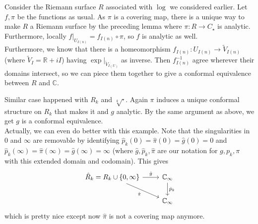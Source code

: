 \begin{example}
    Consider the Riemann surface $R$ associated with $\log$ we considered earlier.
    Let $f,\pi$ be the functions as usual.
    As $\pi$ is a covering map, there is a unique way to make $R$ a Riemann surface by the preceding lemma where $\pi:R\to C_\star$ is analytic.
    Furthermore, locally $f|_{U_{I(n)}}=f_{I(n)}\circ\pi$, so $f$ is analytic as well.\\
    Furthermore, we know that there is a homeomorphism $f_{I(n)}:U_{I(n)}\to\tilde{V}_{I(n)}$ (where $\tilde{V}_I=\mathbb R+iI$) having $\exp|_{\tilde{V}_{I(U)}}$ as inverse.
    Then $f_{I(n)}^{-1}$ agree wherever their domains intersect, so we can piece them together to give a conformal equivalence between $R$ and $\mathbb C$.
\end{example}
\begin{example}
    Similar case happened with $R_k$ and $\sqrt[k]{\cdot}$.
    Again $\pi$ induces a unique conformal structure on $R_k$ that makes it and $g$ analytic.
    By the same argument as above, we get $g$ is a conformal equivalence.\\
    Actually, we can even do better with this example.
    Note that the singularities in $0$ and $\infty$ are removable by identifying $\hat{p}_k(0)=\hat{\pi}(0)=\hat{g}(0)=0$ and $\hat{p}_k(\infty)=\hat{\pi}(\infty)=\hat{g}(\infty)=\infty$ (where $\hat{g},\hat{p}_k,\hat{\pi}$ are our notation for $g,p_k,\pi$ with this extended domain and codomain).
    This gives
    \[
        \begin{tikzcd}
            \hat{R}_k=R_k\cup\{0,\infty\}\arrow{r}{\hat{g}}\arrow[swap]{dr}{\hat{\pi}}&\mathbb C_\infty\arrow{d}{\hat{p}_k}\\
            &\mathbb C_\infty
        \end{tikzcd}
    \]
    which is pretty nice except now $\hat{\pi}$ is not a covering map anymore.
\end{example}